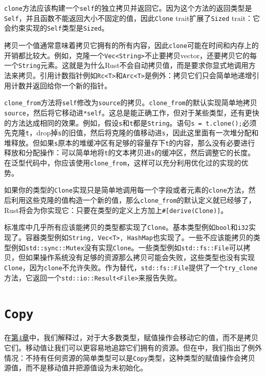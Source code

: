 \texttt{clone}方法应该构建一个\texttt{self}的独立拷贝并返回它。因为这个方法的返回类型是\texttt{Self}，并且函数不能返回大小不固定的值，因此\texttt{Clone} trait扩展了\texttt{Sized} trait：它会约束实现的\texttt{Self}类型是\texttt{Sized}。

拷贝一个值通常意味着拷贝它拥有的所有内容，因此\texttt{clone}可能在时间和内存上的开销都比较大。例如，克隆一个\texttt{Vec<String>}不止要拷贝vector，还要拷贝它的每一个\texttt{String}元素。这就是为什么Rust不会自动拷贝值，而是要求你显式地调用方法来拷贝。引用计数指针例如\texttt{Rc<T>}和\texttt{Arc<T>}是例外：拷贝它们只会简单地递增引用计数并返回给你一个新的指针。

\texttt{clone\_from}方法将\texttt{self}修改为\texttt{source}的拷贝。\texttt{clone\_from}的默认实现简单地拷贝\texttt{source}，然后将它移动进\texttt{*self}。这总是能正确工作，但对于某些类型，还有更快的方法达成相同的效果。例如，假设\texttt{s}和\texttt{t}都是\texttt{String}。语句\texttt{s = t.clone();}必须先克隆\texttt{t}，drop掉\texttt{s}的旧值，然后将克隆的值移动进\texttt{s}，因此这里面有一次堆分配和堆释放。但如果\texttt{s}原本的堆缓冲区有足够的容量存下\texttt{t}的内容，那么没有必要进行释放和分配操作：可以简单地将\texttt{t}的文本拷贝进\texttt{s}的缓冲区，然后调整它的长度。在泛型代码中，你应该使用\texttt{clone\_from}，这样可以充分利用优化过的实现的优势。

如果你的类型的\texttt{Clone}实现只是简单地调用每一个字段或者元素的\texttt{clone}方法，然后利用这些克隆的值构造一个新的值，那么\texttt{clone\_from}的默认定义就已经够了，Rust将会为你实现它：只要在类型的定义上方加上\texttt{\#[derive(Clone)]}。

标准库中几乎所有应该能拷贝的类型都实现了\texttt{Clone}。基本类型例如\texttt{bool}和\texttt{i32}实现了。容器类型例如\texttt{String, Vec<T>, HashMap}也实现了。一些不应该能拷贝的类型例如\texttt{std::sync::Mutex}没有实现\texttt{Clone}。一些类型例如\texttt{std::fs::File}可以拷贝，但如果操作系统没有足够的资源那么拷贝可能会失败，这些类型也没有实现\texttt{Clone}，因为\texttt{clone}不允许失败。作为替代，\texttt{std::fs::File}提供了一个\texttt{try\_clone}方法，它返回一个\texttt{std::io::Result<File>}来报告失败。

\section{\texttt{Copy}}\label{Copy}

在\hyperref[ch04]{第4章}中，我们解释过，对于大多数类型，赋值操作会移动它的值，而不是拷贝它们。移动值让我们可以更容易地追踪它们拥有的资源。但在中，我们指出了例外情况：不持有任何资源的简单类型可以是\texttt{Copy}类型，这种类型的赋值操作会拷贝源值，而不是移动值并把源值设为未初始化。

